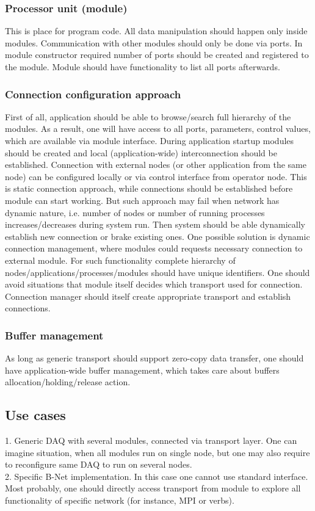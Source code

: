 \subsubsection{Processor unit (module)}
This is place for program code. All data manipulation should happen only inside modules. Communication with other modules should only be done via ports. In module constructor required number of ports should be created and registered to the module. Module should have functionality to list all ports afterwards. 

\subsubsection{Connection configuration approach}
First of all, application should be able to browse/search full hierarchy of the modules. As a result, one will have access to all ports, parameters, control values, which are available via module interface. During application startup modules should be created and local (application-wide) interconnection should be established. Connection with external nodes (or other application from the same node) can be configured locally or via control interface from operator node. 
This is static connection approach, while connections should be established before module can start working. But such approach may fail when network has dynamic nature, i.e. number of nodes or number of running processes increases/decreases during system run. Then system should be able dynamically establish new connection or brake existing ones. One possible solution is dynamic connection management, where modules could requests necessary connection to external module. For such functionality complete hierarchy of nodes/applications/processes/modules should have unique identifiers. One should avoid situations that module itself decides which transport used for connection. Connection manager should itself create appropriate transport and establish connections. 

\subsubsection{Buffer management}
As long as generic transport should support zero-copy data transfer, one should have application-wide buffer management, which takes care about buffers allocation/holding/release action. 

\subsection{Use cases}
1. Generic DAQ with several modules, connected via transport layer. One can imagine situation, when all modules run on single node, but one may also require to reconfigure same DAQ to run on several nodes. \\
2. Specific B-Net implementation. In this case one cannot use standard interface. Most probably, one should directly access transport from module to explore all functionality of specific network (for instance, MPI or verbs).

